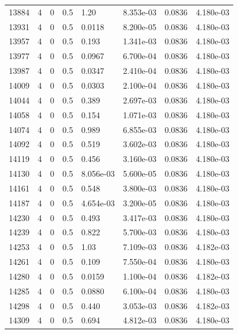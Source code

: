 \documentclass[preview]{standalone}
\begin{document}
{{{{{{{{{{{{{{{\begin{tabular}{L{1.2cm}C{1.2cm} C{0.3cm}C{0.5cm} C{1.4cm}C{1.4cm} C{1.4cm}C{1.4cm}}
  13884  &     4  & 0     & 0.5 &  1.20  & 8.353e-03  & 0.0836 &  4.180e-03   \\ 
  13931  &     4  & 0     & 0.5 &  0.0118  & 8.200e-05  & 0.0836 &  4.180e-03   \\ 
  13957  &     4  & 0     & 0.5 &  0.193  & 1.341e-03  & 0.0836 &  4.180e-03   \\ 
  13977  &     4  & 0     & 0.5 &  0.0967  & 6.700e-04  & 0.0836 &  4.180e-03   \\ 
  13987  &     4  & 0     & 0.5 &  0.0347  & 2.410e-04  & 0.0836 &  4.180e-03   \\ 
  14009  &     4  & 0     & 0.5 &  0.0303  & 2.100e-04  & 0.0836 &  4.180e-03   \\ 
  14044  &     4  & 0     & 0.5 &  0.389  & 2.697e-03  & 0.0836 &  4.180e-03   \\ 
  14058  &     4  & 0     & 0.5 &  0.154  & 1.071e-03  & 0.0836 &  4.180e-03   \\ 
  14074  &     4  & 0     & 0.5 &  0.989  & 6.855e-03  & 0.0836 &  4.180e-03   \\ 
  14092  &     4  & 0     & 0.5 &  0.519  & 3.602e-03  & 0.0836 &  4.180e-03   \\ 
  14119  &     4  & 0     & 0.5 &  0.456  & 3.160e-03  & 0.0836 &  4.180e-03   \\ 
  14130  &     4  & 0     & 0.5 &  8.056e-03  & 5.600e-05  & 0.0836 &  4.180e-03   \\ 
  14161  &     4  & 0     & 0.5 &  0.548  & 3.800e-03  & 0.0836 &  4.180e-03   \\ 
  14187  &     4  & 0     & 0.5 &  4.654e-03  & 3.200e-05  & 0.0836 &  4.180e-03   \\ 
  14230  &     4  & 0     & 0.5 &  0.493  & 3.417e-03  & 0.0836 &  4.180e-03   \\ 
  14239  &     4  & 0     & 0.5 &  0.822  & 5.700e-03  & 0.0836 &  4.180e-03   \\ 
  14253  &     4  & 0     & 0.5 &  1.03  & 7.109e-03  & 0.0836 &  4.182e-03   \\ 
  14261  &     4  & 0     & 0.5 &  0.109  & 7.550e-04  & 0.0836 &  4.180e-03   \\ 
  14280  &     4  & 0     & 0.5 &  0.0159  & 1.100e-04  & 0.0836 &  4.182e-03   \\ 
  14285  &     4  & 0     & 0.5 &  0.0880  & 6.100e-04  & 0.0836 &  4.180e-03   \\ 
  14298  &     4  & 0     & 0.5 &  0.440  & 3.053e-03  & 0.0836 &  4.182e-03   \\ 
  14309  &     4  & 0     & 0.5 &  0.694  & 4.812e-03  & 0.0836 &  4.180e-03   \\ 

\end{tabular}}}}}}}}}}}}}}}}
\end{document}
